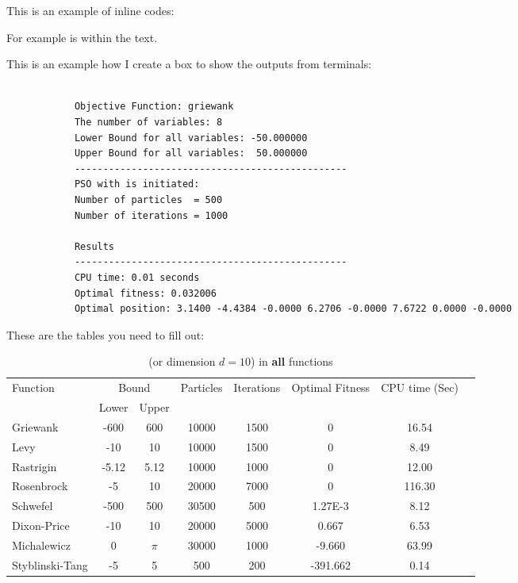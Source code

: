 \documentclass[12pt]{article}
\begin{document}
	
	
	
	
	This is an example of inline codes:
	
	{\scriptsize {}}
	
	
	For example  is within the text.
	
	This is an example how I create a box to show the outputs from terminals:
	
	\begin{mdframed}[style=myboxstyleTerminal1]
		\footnotesize
		\begin{verbatim}
			
			Objective Function: griewank
			The number of variables: 8
			Lower Bound for all variables: -50.000000
			Upper Bound for all variables:  50.000000
			------------------------------------------------
			PSO with is initiated:
			Number of particles  = 500
			Number of iterations = 1000 
			
			Results
			------------------------------------------------
			CPU time: 0.01 seconds
			Optimal fitness: 0.032006
			Optimal position: 3.1400 -4.4384 -0.0000 6.2706 -0.0000 7.6722 0.0000 -0.0000
		\end{verbatim}
	\end{mdframed}
	
	These are the tables you need to fill out:
	
	\begin{table}[H]
		\caption{ (or dimension $d=10$) in \textbf{all} functions}
		\label{table:1}
		\centering
		\begin{tabular}{l c c c c c c c}
			\hline
			Function &  \multicolumn{2}{c}{Bound} & Particles & Iterations &  Optimal Fitness & CPU time (Sec) \\
			& Lower& Upper&&&\\
			\hline
			Griewank  		&  -600   & 600 	&10000 &1500  &0  &16.54 &\\
			Levy 	  		&  -10    & 10 		&10000 &1500 &0 &8.49 &\\
			Rastrigin 		&  -5.12  & 5.12 	&10000 &1000 &0 &12.00 &\\
			Rosenbrock		&  -5     & 10 		&20000 &7000 &0 &116.30 &\\
			Schwefel 	 	&  -500   & 500 	&30500 &500 &1.27E-3 &8.12 &\\
			Dixon-Price 	&   -10	  & 10 		&20000 &5000 &0.667 &6.53 &\\
			Michalewicz 	&   0 	  & $\pi$ 	&30000 &1000 &-9.660 &63.99 &\\
			Styblinski-Tang & -5 	  & 5  		&500 &200 &-391.662 &0.14 &\\
			\hline
		\end{tabular}
	\end{table}
	
\end{document}
